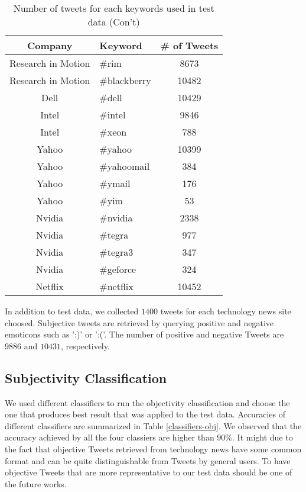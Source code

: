 \documentclass[12pt]{article}
\begin{document}
\begin{table}
\begin{center}
    \begin{tabular}{ | c || l | c | }
        \hline
        \textbf{Company} &  \textbf{Keyword} & \textbf{\# of Tweets} \\ \hline
        \hline
        Research in Motion &  \#rim & 8673 \\ \hline
        Research in Motion &  \#blackberry & 10482 \\ \hline
        Dell &  \#dell & 10429 \\ \hline
        Intel &  \#intel & 9846 \\ \hline
        Intel &  \#xeon & 788 \\ \hline
        Yahoo &  \#yahoo & 10399 \\ \hline
        Yahoo &  \#yahoomail & 384 \\ \hline
        Yahoo &  \#ymail & 176 \\ \hline
        Yahoo &  \#yim & 53 \\ \hline
        Nvidia &  \#nvidia & 2338 \\ \hline
        Nvidia &  \#tegra & 977 \\ \hline
        Nvidia &  \#tegra3 & 347 \\ \hline
        Nvidia &  \#geforce & 324 \\ \hline
        Netflix &  \#netflix & 10452 \\ \hline
        \hline
    \end{tabular}
\caption{Number of tweets for each keywords used in test data (Con't)}
\label{keywords-tweet-numbers-02}
\end{center}
\end{table}

In addition to test data, we collected $1400$ tweets for each technology news site choosed. Subjective tweets are retrieved by querying positive and negative emoticons such as ':)' or ':('. The number of positive and negative Tweets are $9886$ and $10431$, respectively.

\subsection{Subjectivity Classification}
We used different classifiers to run the objectivity classification and choose the one that produces best result that was applied to the test data. Accuracies of different classifiers are summarized in Table \ref{classifiers-obj}. We observed that the accuracy achieved by all the four classiers are higher than $90\%$. It might due to the fact that objective Tweets retrieved from technology news have some common format and can be quite distinguishable from Tweets by general users. To have objective Tweets that are more representative to our test data should be one of the future works.
\end{document}
